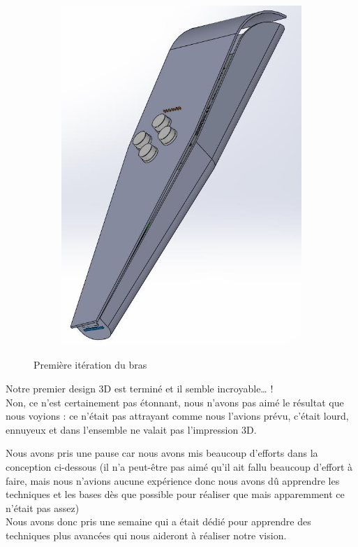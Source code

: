 \begin{figure}
\begin{subfigure}[m]{.48\linewidth}
        \centering
        \includegraphics[width=\textwidth]{assets/conception1/img164.jpg}
    \end{subfigure}
    \caption{Première itération du bras}
\end{figure}

\FloatBarrier

Notre premier design 3D est terminé et il semble incroyable… !\\
Non, ce n’est certainement pas étonnant, nous n’avons pas aimé le résultat que nous voyions : ce n’était pas attrayant comme nous l’avions prévu, c’était lourd, ennuyeux et dans l’ensemble ne valait pas l’impression 3D.

Nous avons pris une pause car nous avons mis beaucoup d’efforts dans la conception ci-dessous (il n’a peut-être pas aimé qu’il ait fallu beaucoup d’effort à faire, mais nous n’avions aucune expérience donc nous avons dû apprendre les techniques et les bases dès que possible pour réaliser que mais apparemment ce n’était pas assez)  \\
Nous avons donc pris une semaine qui a était dédié pour apprendre des techniques plus avancées qui nous aideront à réaliser notre vision.

